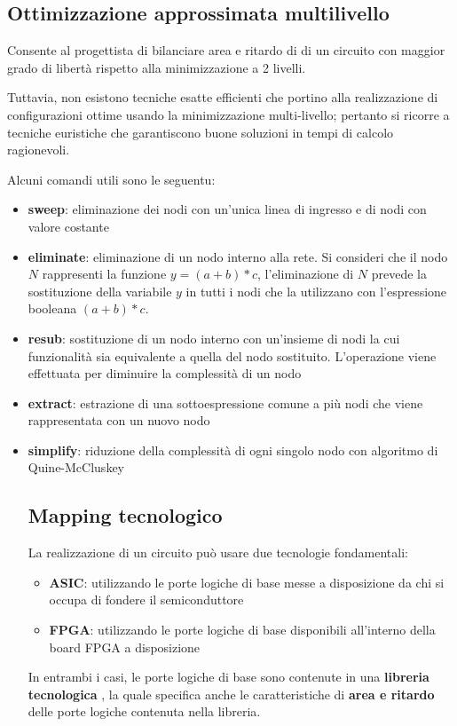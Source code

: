 \documentclass[a4paper]{article}
\theoremstyle{break}
\theoremstyle{break}
\theoremstyle{break}
\theoremstyle{break}
\begin{document}
\subsection{Ottimizzazione approssimata multilivello}
Consente al progettista di bilanciare area e ritardo di di un circuito con maggior
grado di libertà rispetto alla minimizzazione a 2 livelli.

Tuttavia, non esistono tecniche esatte efficienti che portino alla realizzazione di
configurazioni ottime usando la minimizzazione multi-livello; pertanto si ricorre
a tecniche euristiche che garantiscono buone soluzioni in tempi di calcolo ragionevoli.

Alcuni comandi utili sono le seguentu:
\begin{itemize}
  \item \textbf{sweep}: eliminazione dei nodi con un'unica linea di ingresso e di nodi
    con valore costante
  \item \textbf{eliminate}: eliminazione di un nodo interno alla rete. Si consideri
    che il nodo \( N \) rappresenti la funzione \( y = (a+b) * c \), l'eliminazione
    di \( N \) prevede la sostituzione della variabile \( y \) in tutti i nodi che la
    utilizzano con l'espressione booleana \( (a+b) * c \).
  \item \textbf{resub}: sostituzione di un nodo interno con un’insieme di nodi la cui
funzionalità sia equivalente a quella del nodo sostituito.
L’operazione viene effettuata per diminuire la complessità di
un nodo
  \item \textbf{extract}: estrazione di una sottoespressione comune a più nodi che
viene rappresentata con un nuovo nodo
  \item \textbf{simplify}: riduzione della complessità di ogni singolo nodo con algoritmo
di Quine-McCluskey

\subsection{Mapping tecnologico}
La realizzazione di un circuito può usare due tecnologie fondamentali:
\begin{itemize}
  \item \textbf{ASIC}: utilizzando le porte logiche di base messe a disposizione da
    chi si occupa di fondere il semiconduttore
  \item \textbf{FPGA}: utilizzando le porte logiche di base disponibili all'interno della
    board FPGA a disposizione
\end{itemize}
In entrambi i casi, le porte logiche di base sono contenute in una \textbf{libreria tecnologica}
, la quale specifica anche le caratteristiche di \textbf{area e ritardo} delle porte logiche
contenuta nella libreria.
\end{itemize}
\end{document}

